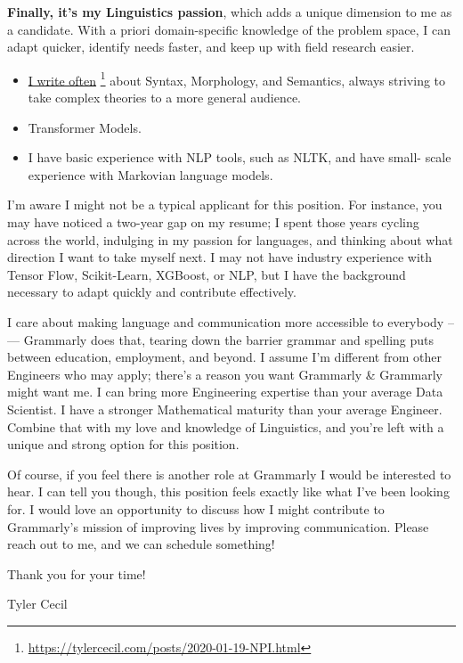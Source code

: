 \documentclass[]{article}
\newcommand{\cvcolor}[1]{{\color{MidnightBlue}#1}}
\newcommand{\hl}[1]{\cvcolor{\textbf{#1}}}
\renewcommand{\cite}[2]{\href{#2}{#1} \footnote{\href{#2}{#2}}}
\begin{document}
\begin{adjustwidth}{30pt}{30pt}
  \hl{Finally, it's my Linguistics passion}, which adds a unique dimension
  to me as a candidate. With a priori domain-specific knowledge of the problem
  space, I can adapt quicker, identify needs faster, and keep up with field
  research easier.
  \begin{itemize}
    \item \cite{I write
      often}{https://tylercecil.com/posts/2020-01-19-NPI.html} about Syntax,
      Morphology, and Semantics, always striving to take complex theories to a
      more general audience.
    \item Transformer Models.
    \item I have basic experience with NLP tools, such as NLTK, and have small-
      scale experience with Markovian language models.
  \end{itemize}\medskip

  I'm aware I might not be a typical applicant for this position. For instance,
  you may have noticed a two-year gap on my resume; I spent those years cycling
  across the world, indulging in my passion for languages, and thinking about
  what direction I want to take myself next. I may not have industry experience
  with Tensor Flow, Scikit-Learn, XGBoost, or NLP, but I have the background
  necessary to adapt quickly and contribute effectively.\medskip

  I care about making language and communication more accessible to everybody
  --— Grammarly does that, tearing down the barrier grammar and spelling puts
  between education, employment, and beyond. I assume I'm different from
  other Engineers who may apply; there's a reason you want Grammarly &
  Grammarly might want me. I can bring more Engineering expertise than your
  average Data Scientist. I have a stronger Mathematical maturity than your
  average Engineer. Combine that with my love and knowledge of Linguistics,
  and you're left with a unique and strong option for this position. \medskip

  Of course, if you feel there is another role at Grammarly I would be
  interested to hear. I can tell you though, this position feels exactly like
  what I've been looking for. I would love an opportunity to discuss how I
  might contribute to Grammarly's mission of improving lives by improving
  communication. Please reach out to me, and we can schedule something!
  \bigskip

  Thank you for your time!

  Tyler Cecil
\end{adjustwidth}
\end{document}
